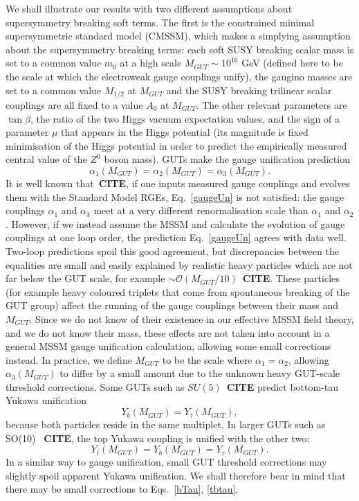 \documentclass[final,3p,times,pdflatex]{elsarticle}
\begin{document}
We shall illustrate our results with two different assumptions about
supersymmetry breaking soft terms. The first is the
constrained minimal supersymmetric standard model (CMSSM), which makes a
simplying 
assumption about the supersymmetry breaking terms: each soft SUSY breaking
scalar mass is set to a common value $m_0$ at a high scale $M_{GUT}\sim
10^{16}$ GeV (defined
here to be the scale at which the electroweak gauge couplings unify), the
gaugino masses are set to a common value $M_{1/2}$ at $M_{GUT}$ and the 
SUSY breaking trilinear scalar couplings are all fixed to a value $A_0$ at
$M_{GUT}$. The other relevant parameters are $\tan \beta$, the ratio of the
two Higgs vacuum expectation values, and the sign of a parameter $\mu$ that
appears in the Higgs potential (its magnitude is fixed minimisation of the
Higgs potential in order to predict the empirically measured central value of
the $Z^0$ boson mass). GUTs make the gauge unification prediction 
\begin{equation}
\alpha_1(M_{GUT})=\alpha_2(M_{GUT})=\alpha_3(M_{GUT}).  \label{gaugeUn}
\end{equation}
It is well known that~{\bf CITE}, if one inputs measured gauge couplings and
evolves them with the Standard Model RGEs, Eq.~\ref{gaugeUn} is not satisfied:
the gauge couplings $\alpha_1$ and $\alpha_3$ meet at a very different
renormalisation scale than $\alpha_1$ and $\alpha_2$. However, if we instead
assume the MSSM and calculate the evolution of gauge couplings at one loop
order, the prediction Eq.~\ref{gaugeUn} agrees with data well. Two-loop
predictions spoil this good agreement, but discrepancies between the
equalities are small and easily explained by realistic heavy particles which
are not far below the GUT scale, for example $\sim \mathcal O(M_{GUT}/10)$~{\bf CITE}. 
These particles (for example heavy coloured triplets that come from
spontaneous breaking of the GUT group) affect the running of the gauge
couplings between their mass and $M_{GUT}$. Since we do not know of their
existence in our effective MSSM field theory, and we do not know their mass,
these effects are not taken into account in a general MSSM gauge unification
calculation, allowing some small corrections instead.
In practice, we define $M_{GUT}$
to be the scale where $\alpha_1=\alpha_2$, allowing $\alpha_3(M_{GUT})$ to
differ by a small amount due to the unknown heavy GUT-scale threshold
corrections.  
Some GUTs such as $SU(5)$~{\bf CITE} predict bottom-tau Yukawa unification
\begin{equation}
Y_b(M_{GUT})=Y_\tau(M_{GUT}), \label{bTau}
\end{equation}
because both
particles reside in the same multiplet. In larger GUTs such as SO(10)~{\bf
  CITE}, the top 
Yukawa coupling is unified with the other two:
\begin{equation}
Y_t(M_{GUT})=Y_b(M_{GUT})=Y_\tau(M_{GUT}). \label{tbtau}
\end{equation}
In a similar way to gauge unification, small GUT threshold corrections may
slightly spoil apparent Yukawa unification. We shall therefore bear in mind
that there 
may be small corrections to Eqs.~\ref{bTau}, \ref{tbtau}.
\end{document}
